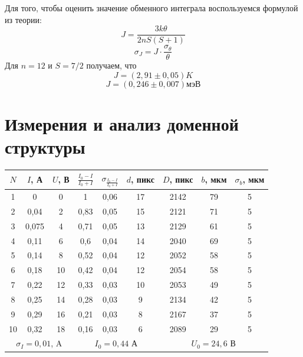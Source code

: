 \documentclass[a4paper, 12pt]{article}%
\begin{document}
Для того, чтобы оценить значение обменного интеграла воспользуемся формулой из теории:
\[J = \frac{3 k \theta}{2nS\left(S+1\right)}\]
\[\sigma_J = J \cdot \frac{\sigma_{\theta}}{\theta}\]
Для $n = 12$ и $S = 7/2$ получаем, что 
\[J = \left(2,91 \pm 0,05\right) K\]
\[J = \left(0,246 \pm 0,007\right) \text{мэВ}\]
\section{Измерения и анализ доменной структуры}
\begin{table}[h]
\begin{center}
\begin{tabular}{|c|c|c|c|c|c|c|c|c|}
\hline
$N$        & $I$, А        & $U$, В        & $\frac{I_0 - I}{I_0 + I}$ & $\sigma_{\frac{I_0 - I}{I_0 + I}}$ & $d$, пикс & $D$, пикс & $b$, мкм & $\sigma_b$, мкм \\ \hline
1          & 0             & 0             & 1                         & 0,06                               & 17        & 2142      & 79       & 5               \\ \hline
2          & 0,04          & 2             & 0,83                      & 0,05                               & 15        & 2121      & 71       & 5               \\ \hline
3          & 0,075         & 4             & 0,71                      & 0,05                               & 13        & 2129      & 61       & 5               \\ \hline
4          & 0,11          & 6             & 0,6                       & 0,04                               & 14        & 2040      & 69       & 5               \\ \hline
5          & 0,14          & 8             & 0,52                      & 0,04                               & 12        & 2052      & 58       & 5               \\ \hline
6          & 0,18          & 10            & 0,42                      & 0,04                               & 12        & 2054      & 58       & 5               \\ \hline
7          & 0,22          & 12            & 0,33                      & 0,03                               & 10        & 2053      & 49       & 5               \\ \hline
8          & 0,25          & 14            & 0,28                      & 0,03                               & 9         & 2134      & 42       & 5               \\ \hline
9          & 0,29          & 16            & 0,21                      & 0,03                               & 8         & 2167      & 37       & 5               \\ \hline
10         & 0,32          & 18            & 0,16                      & 0,03                               & 6         & 2089      & 29       & 5               \\ \hline
\multicolumn{3}{|c|}{$\sigma_I = 0,01$, A} & \multicolumn{3}{c|}{$I_0 = 0,44$ А}                                        & \multicolumn{3}{c|}{$U_0 = 24,6$ В}    \\ \hline
\end{tabular}


\end{center}
\end{table}
\end{document}
